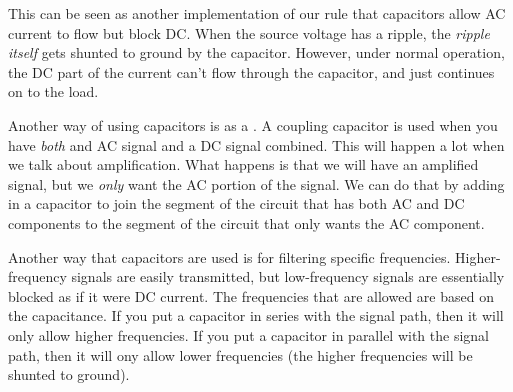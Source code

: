 
This can be seen as another implementation of our rule that capacitors allow AC current to flow but block DC.
When the source voltage has a ripple, the \emph{ripple itself} gets shunted to ground by the capacitor.
However, under normal operation, the DC part of the current can't flow through the capacitor, and just continues on to the load.

Another way of using capacitors is as a .
A coupling capacitor is used when you have \emph{both} and AC signal and a DC signal combined.
This will happen a lot when we talk about amplification.
What happens is that we will have an amplified signal, but we \emph{only} want the AC portion of the signal.
We can do that by adding in a capacitor to join the segment of the circuit that has both AC and DC components to the segment of the circuit that only wants the AC component.

Another way that capacitors are used is for filtering specific frequencies.
Higher-frequency signals are easily transmitted, but low-frequency signals are essentially blocked as if it were DC current.
The frequencies that are allowed are based on the capacitance.
If you put a capacitor in series with the signal path, then it will only allow higher frequencies.
If you put a capacitor in parallel with the signal path, then it will ony allow lower frequencies (the higher frequencies will be shunted to ground).


